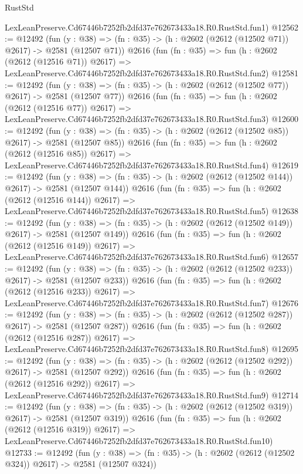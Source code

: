 \begin{lexlean}{RustStd}
\begin{coremodule}
    LexLeanPreserve.Cd67446b7252fb2dfd37e762673433a18.R0.RustStd.fun1)
@12562 := @12492
    (fun (y : @38) => (fn : @35) -> (h : @2602 (@2612 (@12502 @71)) @2617) -> @2581 (@12507 @71))
    @2616
    (fun (fn : @35) =>
    fun (h : @2602 (@2612 (@12516 @71)) @2617) =>
    LexLeanPreserve.Cd67446b7252fb2dfd37e762673433a18.R0.RustStd.fun2)
@12581 := @12492
    (fun (y : @38) => (fn : @35) -> (h : @2602 (@2612 (@12502 @77)) @2617) -> @2581 (@12507 @77))
    @2616
    (fun (fn : @35) =>
    fun (h : @2602 (@2612 (@12516 @77)) @2617) =>
    LexLeanPreserve.Cd67446b7252fb2dfd37e762673433a18.R0.RustStd.fun3)
@12600 := @12492
    (fun (y : @38) => (fn : @35) -> (h : @2602 (@2612 (@12502 @85)) @2617) -> @2581 (@12507 @85))
    @2616
    (fun (fn : @35) =>
    fun (h : @2602 (@2612 (@12516 @85)) @2617) =>
    LexLeanPreserve.Cd67446b7252fb2dfd37e762673433a18.R0.RustStd.fun4)
@12619 := @12492
    (fun (y : @38) => (fn : @35) -> (h : @2602 (@2612 (@12502 @144)) @2617) -> @2581 (@12507 @144))
    @2616
    (fun (fn : @35) =>
    fun (h : @2602 (@2612 (@12516 @144)) @2617) =>
    LexLeanPreserve.Cd67446b7252fb2dfd37e762673433a18.R0.RustStd.fun5)
@12638 := @12492
    (fun (y : @38) => (fn : @35) -> (h : @2602 (@2612 (@12502 @149)) @2617) -> @2581 (@12507 @149))
    @2616
    (fun (fn : @35) =>
    fun (h : @2602 (@2612 (@12516 @149)) @2617) =>
    LexLeanPreserve.Cd67446b7252fb2dfd37e762673433a18.R0.RustStd.fun6)
@12657 := @12492
    (fun (y : @38) => (fn : @35) -> (h : @2602 (@2612 (@12502 @233)) @2617) -> @2581 (@12507 @233))
    @2616
    (fun (fn : @35) =>
    fun (h : @2602 (@2612 (@12516 @233)) @2617) =>
    LexLeanPreserve.Cd67446b7252fb2dfd37e762673433a18.R0.RustStd.fun7)
@12676 := @12492
    (fun (y : @38) => (fn : @35) -> (h : @2602 (@2612 (@12502 @287)) @2617) -> @2581 (@12507 @287))
    @2616
    (fun (fn : @35) =>
    fun (h : @2602 (@2612 (@12516 @287)) @2617) =>
    LexLeanPreserve.Cd67446b7252fb2dfd37e762673433a18.R0.RustStd.fun8)
@12695 := @12492
    (fun (y : @38) => (fn : @35) -> (h : @2602 (@2612 (@12502 @292)) @2617) -> @2581 (@12507 @292))
    @2616
    (fun (fn : @35) =>
    fun (h : @2602 (@2612 (@12516 @292)) @2617) =>
    LexLeanPreserve.Cd67446b7252fb2dfd37e762673433a18.R0.RustStd.fun9)
@12714 := @12492
    (fun (y : @38) => (fn : @35) -> (h : @2602 (@2612 (@12502 @319)) @2617) -> @2581 (@12507 @319))
    @2616
    (fun (fn : @35) =>
    fun (h : @2602 (@2612 (@12516 @319)) @2617) =>
    LexLeanPreserve.Cd67446b7252fb2dfd37e762673433a18.R0.RustStd.fun10)
@12733 := @12492
    (fun (y : @38) => (fn : @35) -> (h : @2602 (@2612 (@12502 @324)) @2617) -> @2581 (@12507 @324))

\end{coremodule}
\end{lexlean}
